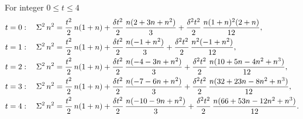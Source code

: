 \begin{example}
  For integer $0 \leq t \leq 4$
  \begin{align*}
    t=0:\quad
    \Sigma^{2}\,{n}^{2}
    &=
    \frac{t^2}{2}\, n(1+n)
    +
    \frac{\delta t^2}{2}\,\frac{n(2+3n+n^2)}{3}
    +
    \frac{\delta^2 t^2}{2}\,\frac{n(1+n)^2(2+n)}{12},
    \\
    t=1:\quad
    \Sigma^{2}\,{n}^{2}
    &=
    \frac{t^2}{2}\, n(1+n)
    +
    \frac{\delta t^2}{2}\,\frac{n(-1+n^2)}{3}
    +
    \frac{\delta^2 t^2}{2}\,\frac{n^2(-1+n^2)}{12},
    \\
    t=2:\quad
    \Sigma^{2}\,{n}^{2}
    &=
    \frac{t^2}{2}\, n(1+n)
    +
    \frac{\delta t^2}{2}\,\frac{n(-4-3n+n^2)}{3}
    +
    \frac{\delta^2 t^2}{2}\,\frac{n(10+5n-4n^2+n^3)}{12},
    \\
    t=3:\quad
    \Sigma^{2}\,{n}^{2}
    &=
    \frac{t^2}{2}\, n(1+n)
    +
    \frac{\delta t^2}{2}\,\frac{n(-7-6n+n^2)}{3}
    +
    \frac{\delta^2 t^2}{2}\,\frac{n(32+23n-8n^2+n^3)}{12},
    \\
    t=4:\quad
    \Sigma^{2}\,{n}^{2}
    &=
    \frac{t^2}{2}\, n(1+n)
    +
    \frac{\delta t^2}{2}\,\frac{n(-10-9n+n^2)}{3}
    +
    \frac{\delta^2 t^2}{2}\,\frac{n(66+53n-12n^2+n^3)}{12}.
  \end{align*}
\end{example}
